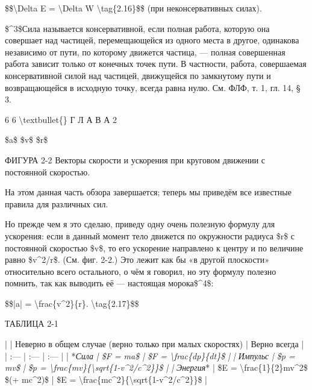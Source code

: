 \documentclass[10pt,oneside]{article}
\begin{document}
\$\$\textbackslash{}Delta E = \textbackslash{}Delta W \textbackslash{}tag\{2.16\}\$\$ (при неконсервативных силах).\par

\$\textasciicircum{}3\$Сила называется консервативной, если полная работа, которую она совершает над частицей, перемещающейся из одного места в другое, одинакова независимо от пути, по которому движется частица, --- полная совершенная работа зависит только от конечных точек пути. В частности, работа, совершаемая консервативной силой над частицей, движущейся по замкнутому пути и возвращающейся в исходную точку, всегда равна нулю. См. ФЛФ, т. 1, гл. 14, § 3.\par

6 6 \textbackslash{}textbullet\{\} Г Л А В А  2\par

\$a\$ \$v\$ \$r\$\par

ФИГУРА 2-2 Векторы скорости и ускорения при круговом движении с постоянной скоростью.\par

На этом данная часть обзора завершается; теперь мы приведём все известные правила для различных сил.\par

Но прежде чем я это сделаю, приведу одну очень полезную формулу для ускорения: если в данный момент тело движется по окружности радиуса \$r\$ с постоянной скоростью \$v\$, то его ускорение направлено к центру и по величине равно \$v\textasciicircum{}2/r\$. (См. фиг. 2-2.) Это лежит как бы «в другой плоскости» относительно всего остального, о чём я говорил, но эту формулу полезно помнить, так как выводить её --- настоящая морока\$\textasciicircum{}4\$:\par

\$\$|a| = \textbackslash{}frac\{v\textasciicircum{}2\}\{r\}. \textbackslash{}tag\{2.17\}\$\$\par

ТАБЛИЦА 2-1\par

| | Неверно в общем случае (верно только при малых скоростях) | Верно всегда | | :--- | :--- | :--- | | *\emph{Сила}\emph{ | \$F = ma\$ | \$F = \textbackslash{}frac\{dp\}\{dt\}\$ | | }\emph{Импульс}\emph{ | \$p = mv\$ | \$p = \textbackslash{}frac\{mv\}\{\textbackslash{}sqrt\{1-v\textasciicircum{}2/c\textasciicircum{}2\}\}\$ | | }\emph{Энергия}* | \$E = \textbackslash{}frac\{1\}\{2\}mv\textasciicircum{}2\$ \$(+ mc\textasciicircum{}2)\$ | \$E = \textbackslash{}frac\{mc\textasciicircum{}2\}\{\textbackslash{}sqrt\{1-v\textasciicircum{}2/c\textasciicircum{}2\}\}\$ |\par
\end{document}
